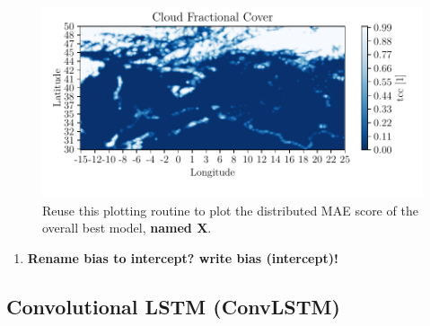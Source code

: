 \begin{figure}
    \centering
    \includegraphics{python_figs/example_artefact.pdf}
    \caption{Reuse this plotting routine to plot the distributed MAE score of the overall best model, \textbf{named X}.}
    \label{fig:grid_mse_best_model}
\end{figure}

\begin{enumerate}
    \item \textbf{Rename bias to intercept? write bias (intercept)!}
\end{enumerate}

\begin{table}[hp]
    \centering
    \caption{Add the weights of the best model.}
    \label{tab:weights_best_model}
\end{table}

\subsection{Convolutional LSTM (ConvLSTM)}

